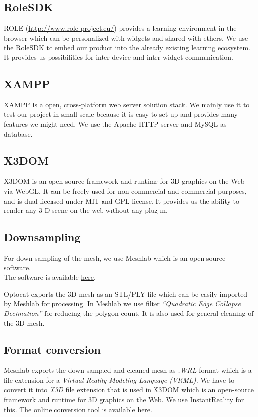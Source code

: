 \documentclass[twoside,12pt,a4paper]{article}
\begin{document}
\subsection{RoleSDK}
\label{sub:RoleSDK}
ROLE (\href{http://www.role-project.eu/}{http://www.role-project.eu/}) provides a learning environment in the browser which can be personalized with widgets and shared with others. We use the RoleSDK to embed our product into the already existing learning ecosystem. It provides us possibilities for inter-device and inter-widget communication.

\subsection{XAMPP}
\label{sub:XAMPP}
XAMPP is a open, cross-platform web server solution stack. We mainly use it to test our project in small scale because it is easy to set up and provides many features we might need. We use the Apache HTTP server and MySQL as database.

\subsection{X3DOM}
\label{sub:X3Dom}
X3DOM is an open-source framework and runtime for 3D graphics on the Web via WebGL. It can be freely used for non-commercial and commercial purposes, and is dual-licensed under MIT and GPL license. It provides us the ability to render any 3-D scene on the web without any plug-in.

\subsection{Downsampling} %
\label{sub:downsampling}
For down sampling of the mesh, we use Meshlab which is an open source software.\\
The software is available \href{http://meshlab.sourceforge.net}{here}.

Optocat exports the 3D mesh as an STL/PLY file which can be easily imported by Meshlab for processing. In Meshlab we use filter \textit{“Quadratic Edge Collapse Decimation”} for reducing the polygon count. It is also used for general cleaning of the 3D mesh.


\subsection{Format conversion} %
\label{sub:Format Conversion}
Meshlab exports the down sampled and cleaned mesh as \textit{.WRL}  format which is a file extension for a \textit{Virtual Reality Modeling Language (VRML).} We have to convert it into \textit{X3D} file extension that is used in X3DOM which is an open-source framework and runtime for 3D graphics on the Web. We use InstantReality for this. The online conversion tool is available \href{http://doc.instantreality.org/tools/x3d_encoding_converter/}{here}.
\end{document}

